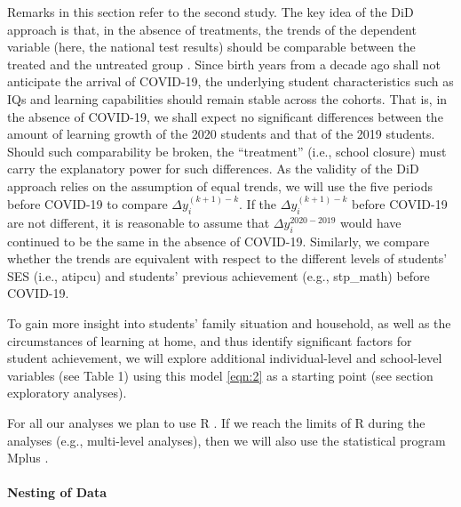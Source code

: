 Remarks in this section refer to the second study. The key idea of the DiD approach is that, in the absence of treatments, the trends of the dependent variable (here, the national test results) should be comparable between the treated and the untreated group \parencite[i.e., school closures, ][]{angrist:2009}. Since birth years from a decade ago shall not anticipate the arrival of COVID-19, the underlying student characteristics such as IQs and learning capabilities should remain stable across the cohorts. That is, in the absence of COVID-19, we shall expect no significant differences between the amount of learning growth of the 2020 students and that of the 2019 students. Should such comparability be broken, the ``treatment'' (i.e., school closure) must carry the explanatory power for such differences. As the validity of the DiD approach relies on the assumption of equal trends, we will use the five periods before COVID-19 to compare $\Delta y_i^{(k+1)-k}$. If the $\Delta y_i^{(k+1)-k}$ before COVID-19 are not different, it is reasonable to assume that  $\Delta y_i^{2020-2019}$ would have continued to be the same in the absence of COVID-19.  Similarly, we compare whether the trends are equivalent with respect to the different levels of students' SES (i.e., atipcu) and students' previous achievement (e.g., stp\_math) before COVID-19.

To gain more insight into students' family situation and household, as well as the circumstances of learning at home, and thus identify significant factors for student achievement, we will explore additional individual-level and school-level variables (see Table 1) using this model \cref{eqn:2} as a starting point (see section exploratory analyses).

For all our analyses we plan to use R \parencite{r}. If we reach the limits of R during the analyses (e.g., multi-level analyses), then we will also use the statistical program Mplus \parencite{mplus}.

\paragraph{Nesting of Data}

